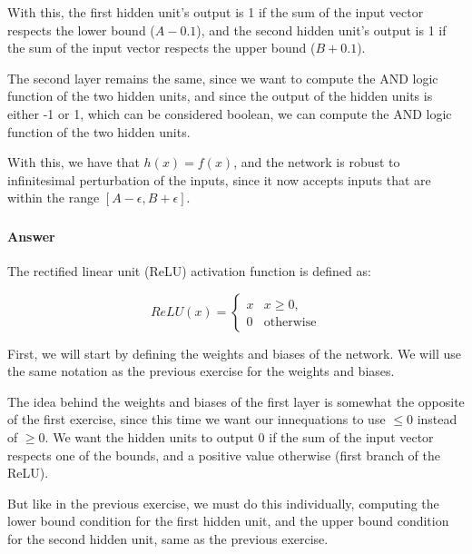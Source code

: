 \documentclass{article}
\begin{document}
With this, the first hidden unit's output is 1 if the sum of the input vector respects the lower bound ($A - 0.1$),
and the second hidden unit's output is 1 if the sum of the input vector respects the upper bound ($B + 0.1$).

The second layer remains the same, since we want to compute the AND logic function of the two hidden units, and since the output of
the hidden units is either -1 or 1, which can be considered boolean, we can compute the AND logic function of the two hidden units.

\bigskip

With this, we have that \(h(x) = f(x)\), and the network is robust to infinitesimal perturbation of the inputs, since it now accepts inputs
that are within the range \([A - \epsilon, B + \epsilon]\).

\subsubsection{}

\paragraph{Answer}

The rectified linear unit (ReLU) activation function is defined as:

\[ 
    ReLU(x) = 
    \begin{cases}
        x & x \geq 0, \\
        0 & \text{otherwise}
    \end{cases}
\]

First, we will start by defining the weights and biases of the network. We will use the same notation as the previous 
exercise for the weights and biases.

\bigskip

The idea behind the weights and biases of the first layer is somewhat the opposite of the first exercise, since this time we want our innequations
to use $\leq 0$ instead of $\geq 0$. We want the hidden units to output 0 if the sum of the input vector respects one of the bounds, 
and a positive value otherwise (first branch of the ReLU).

But like in the previous exercise, we must do this individually, computing the lower bound condition for the first hidden unit, 
and the upper bound condition for the second hidden unit, same as the previous exercise.

\bigskip
\end{document}
